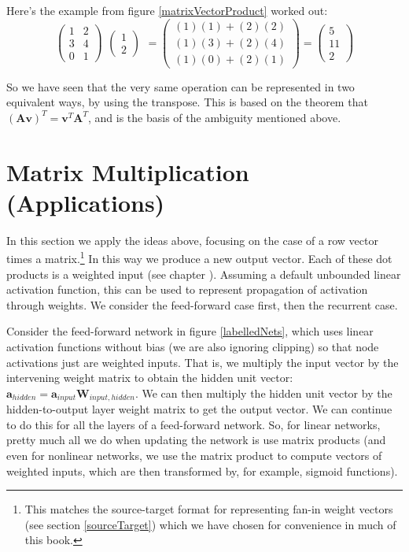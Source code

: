 Here's the example from figure \ref{matrixVectorProduct} worked out:
\[
  \begin{pmatrix}
    1 & 2 \\
    3 & 4 \\
    0 & 1
  \end{pmatrix}
    \begin{matrix}
    \begin{pmatrix}1\\2\end{pmatrix}
  \end{matrix}
  =
  \begin{pmatrix}
    (1)(1) + (2)(2) \\
    (1)(3) + (2)(4) \\
    (1)(0) + (2)(1)
  \end{pmatrix}
  =
  \begin{pmatrix}
    5 \\
    11 \\
    2
  \end{pmatrix}
\]
\vspace*{.1cm}


So we have seen that the very same operation can be represented in two equivalent ways, by using the transpose. This is based on the theorem that  $(\mathbf{A}\mathbf{v})^T =  \mathbf{v}^T\mathbf{A}^T$, and is the basis of the ambiguity mentioned above.

\section{Matrix Multiplication (Applications)}


In this section we apply the ideas above, focusing on the case of a row vector times a matrix.\footnote{This matches the source-target format for representing fan-in weight vectors (see section \ref{sourceTarget}) which we have chosen for convenience in much of this book.} In this way we produce a new output vector. Each of these dot products is a weighted input (see chapter ). Assuming a default unbounded linear activation function, this can be used to represent propagation of activation through weights. We consider the feed-forward case first, then the recurrent case.

Consider the feed-forward network in figure \ref{labelledNets}, which uses linear activation functions without bias (we are also ignoring clipping) so that node activations just are weighted inputs. That is, we multiply the input vector by the intervening weight matrix to obtain the hidden unit vector:  $\textbf{a}_{hidden} = \textbf{a}_{input} \textbf{W}_{input,hidden}$. We can then multiply the hidden unit vector by the hidden-to-output layer weight matrix to get the output vector. We can continue to do this for all the layers of a feed-forward network. So, for linear networks, pretty much all we do when updating the network is use matrix products (and even for nonlinear networks, we use the matrix product to compute vectors of weighted inputs, which are then transformed by, for example, sigmoid functions).


